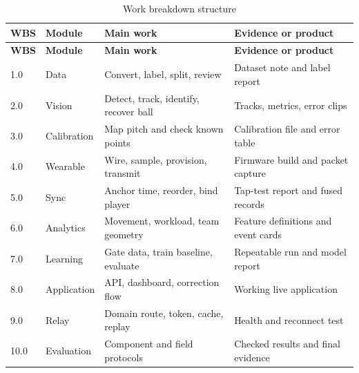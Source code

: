 \begin{longtable}{@{}p{0.45in}p{1.2in}p{2.0in}p{2.0in}@{}}
\caption{Work breakdown structure}\label{tab:wbs}\\
\toprule
\textbf{WBS} & \textbf{Module} & \textbf{Main work} & \textbf{Evidence or product}\\
\midrule
\endfirsthead
\toprule
\textbf{WBS} & \textbf{Module} & \textbf{Main work} & \textbf{Evidence or product}\\
\midrule
\endhead
1.0 & Data & Convert, label, split, review & Dataset note and label report\\
2.0 & Vision & Detect, track, identify, recover ball & Tracks, metrics, error clips\\
3.0 & Calibration & Map pitch and check known points & Calibration file and error table\\
4.0 & Wearable & Wire, sample, provision, transmit & Firmware build and packet capture\\
5.0 & Sync & Anchor time, reorder, bind player & Tap-test report and fused records\\
6.0 & Analytics & Movement, workload, team geometry & Feature definitions and event cards\\
7.0 & Learning & Gate data, train baseline, evaluate & Repeatable run and model report\\
8.0 & Application & API, dashboard, correction flow & Working live application\\
9.0 & Relay & Domain route, token, cache, replay & Health and reconnect test\\
10.0 & Evaluation & Component and field protocols & Checked results and final evidence\\
\bottomrule
\end{longtable}

